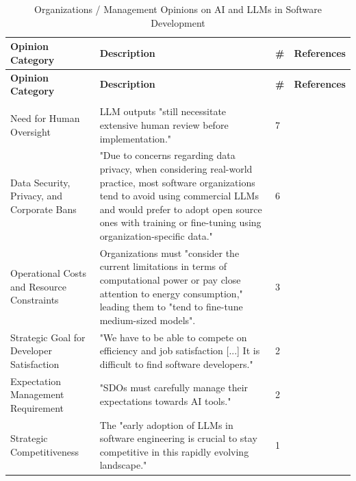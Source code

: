 {\footnotesize
\begin{longtable}{>{\raggedright\arraybackslash}p{3.3cm} p{8.8cm} p{0.2cm} >{\raggedright\arraybackslash}p{1.8cm}}
\caption{Organizations / Management Opinions on AI and LLMs in Software Development}
\label{tab:stakeholder_opinions_orgs} \\

\toprule
\textbf{Opinion Category} & \textbf{Description} & \textbf{\#} & \textbf{References} \\
\midrule
\endfirsthead

\toprule
\textbf{Opinion Category} & \textbf{Description} & \textbf{\#} & \textbf{References} \\
\midrule
\endhead

\midrule
\multicolumn{4}{r}{\textit{Continued on next page}}\\
\bottomrule
\endfoot

\bottomrule
\endlastfoot

Need for Human Oversight & LLM outputs "still necessitate extensive human review before implementation." \cite{Kim:2025ao} & 7 & \cite{Qiu:2025ft, Kim:2025ao, Zhang:2025ea, Basha:2025tt, Terragni:2025fa, Kim:2025is, AlHashimi:2025er} \\ \addlinespace
Data Security, Privacy, and Corporate Bans & "Due to concerns regarding data privacy, when considering real-world practice, most software organizations tend to avoid using commercial LLMs and would prefer to adopt open source ones with training or fine-tuning using organization-specific data." \cite{Wang:2025rs} & 6 & \cite{Banh:2025cf, Wang:2025rs, Terragni:2025fa, Yoo:2025sa, Hemmat:2025rd, Basha:2025tt} \\ \addlinespace
Operational Costs and Resource Constraints & Organizations must "consider the current limitations in terms of computational power or pay close attention to energy consumption," leading them to "tend to fine-tune medium-sized models".\cite{Wang:2025rs} & 3 & \cite{Banh:2025cf, Wang:2025rs, Hemmat:2025rd} \\ \addlinespace
Strategic Goal for Developer Satisfaction & "We have to be able to compete on efficiency and job satisfaction [...] It is difficult to find software developers." \cite{Jensen:2025me} & 2 & \cite{Haque:2025la, Jensen:2025me} \\ \addlinespace
Expectation Management Requirement & "SDOs must carefully manage their expectations towards AI tools." \cite{Jensen:2025me} & 2 & \cite{Jensen:2025me, Basha:2025tt} \\ \addlinespace
Strategic Competitiveness & The "early adoption of LLMs in software engineering is crucial to stay competitive in this rapidly evolving landscape." \cite{Haque:2025la} & 1 & \cite{Haque:2025la} \\

\end{longtable}
}

